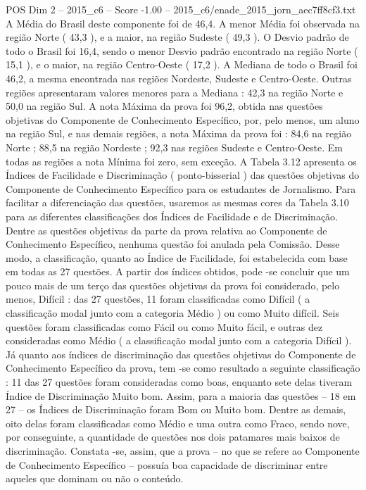 \begin{textsample}{POS Dim 2 – 2015\_c6 – Score -1.00 – 2015\_c6/enade\_2015\_jorn\_aec7ff8cf3.txt}
A Média do Brasil deste componente foi de 46,4.
A menor Média foi observada na região Norte ( 43,3 ), e a maior, na região Sudeste ( 49,3 ).
O Desvio padrão de todo o Brasil foi 16,4, sendo o menor Desvio padrão encontrado na região Norte ( 15,1 ), e o maior, na região Centro-Oeste ( 17,2 ).
A Mediana de todo o Brasil foi 46,2, a mesma encontrada nas regiões Nordeste, Sudeste e Centro-Oeste.
Outras regiões apresentaram valores menores para a Mediana : 42,3 na região Norte e 50,0 na região Sul.
A nota Máxima da prova foi 96,2, obtida nas questões objetivas do Componente de Conhecimento Específico, por, pelo menos, um aluno na região Sul, e nas demais regiões, a nota Máxima da prova foi : 84,6 na região Norte ; 88,5 na região Nordeste ; 92,3 nas regiões Sudeste e Centro-Oeste.
Em todas as regiões a nota Mínima foi zero, sem exceção.
A Tabela 3.12 apresenta os Índices de Facilidade e Discriminação ( ponto-bisserial ) das questões objetivas do Componente de Conhecimento Específico para os estudantes de Jornalismo.
Para facilitar a diferenciação das questões, usaremos as mesmas cores da Tabela 3.10 para as diferentes classificações dos Índices de Facilidade e de Discriminação.
Dentre as questões objetivas da parte da prova relativa ao Componente de Conhecimento Específico, nenhuma questão foi anulada pela Comissão.
Desse modo, a classificação, quanto ao Índice de Facilidade, foi estabelecida com base em todas as 27 questões.
A partir dos índices obtidos, pode -se concluir que um pouco mais de um terço das questões objetivas da prova foi considerado, pelo menos, Difícil : das 27 questões, 11 foram classificadas como Difícil ( a classificação modal junto com a categoria Médio ) ou como Muito difícil.
Seis questões foram classificadas como Fácil ou como Muito fácil, e outras dez consideradas como Médio ( a classificação modal junto com a categoria Difícil ).
Já quanto aos índices de discriminação das questões objetivas do Componente de Conhecimento Específico da prova, tem -se como resultado a seguinte classificação : 11 das 27 questões foram consideradas como boas, enquanto sete delas tiveram Índice de Discriminação Muito bom.
Assim, para a maioria das questões – 18 em 27 – os Índices de Discriminação foram Bom ou Muito bom.
Dentre as demais, oito delas foram classificadas como Médio e uma outra como Fraco, sendo nove, por conseguinte, a quantidade de questões nos dois patamares mais baixos de discriminação.
Constata -se, assim, que a prova – no que se refere ao Componente de Conhecimento Específico – possuía boa capacidade de discriminar entre aqueles que dominam ou não o conteúdo.

\end{textsample}
